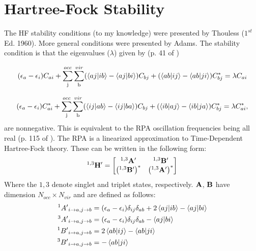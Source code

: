 \documentclass{revtex4}
\begin{document}
\section{Hartree-Fock Stability}
The HF stability conditions (to my knowledge) were presented by Thouless \cite{Thouless1972} ($1^{st}$ Ed. 1960). More general conditions were presented by Adams\cite{Adams1962}. The stability condition is that the eigenvalues ($\lambda$) given by (p. 41 of \cite{Thouless1972}) 

\begin{equation}
(\epsilon_a-\epsilon_i)C_{ai} + \sum\limits_{\text{j}}^{occ}\sum\limits_{\text{b}}^{vir}
	(\braket{aj|ib}-\braket{aj|bi})C_{bj}
	+(\braket{ab|ij}-\braket{ab|ji})C_{bj}^*
	=\lambda C_{ai}
\end{equation}

\begin{equation}
(\epsilon_a-\epsilon_i)C_{ai}^* + \sum\limits_{\text{j}}^{occ}\sum\limits_{\text{b}}^{vir}
	(\braket{ij|ab}-\braket{ij|ba})C_{bj}
	+(\braket{ib|aj}-\braket{ib|ja})C_{bj}^*
	=\lambda C_{ai}^*,
\end{equation}
are nonnegative. This is equivalent to the RPA oscillation frequencies being all real (p. 115 of \cite{Thouless1972}). The RPA is a linearized approximation to Time-Dependent Hartree-Fock theory. These can be written\cite{Dunning1967}\cite{Seeger1977} in the following form:
\begin{equation}\label{eq:1,3H}
{}^{1,3}\bf{H'}=
\begin{bmatrix}
{}^{1,3}\bf{A'} & {}^{1,3}\bf{B'} \\
\left({}^{1,3}\bf{B'}\right)^* & \left({}^{1,3}\bf{A'}\right)^* \\
\end{bmatrix}
\end{equation}
Where the $1,3$ denote singlet and triplet states, respectively. $\bf{A}$, $\bf{B}$ have dimension $N_{occ}\times N_{vir}$ and are defined as follows:
\begin{subequations}
	\begin{align}
	{}^{1}{A'}_{i\rightarrow a, j\rightarrow b} &= (\epsilon_a-\epsilon_i)\delta_{ij}\delta_{ab} + 2\braket{aj|ib}-\braket{aj|bi}\\
	{}^{3}{A'}_{i\rightarrow a, j\rightarrow b} &= (\epsilon_a-\epsilon_i)\delta_{ij}\delta_{ab} - \braket{aj|bi}\\
	{}^{1}{B'}_{i\rightarrow a, j\rightarrow b} &= 2\braket{ab|ij}-\braket{ab|ji}\\
	{}^{3}{B'}_{i\rightarrow a, j\rightarrow b} &= -\braket{ab|ji}
	\end{align}
\end{subequations}
\end{document}
